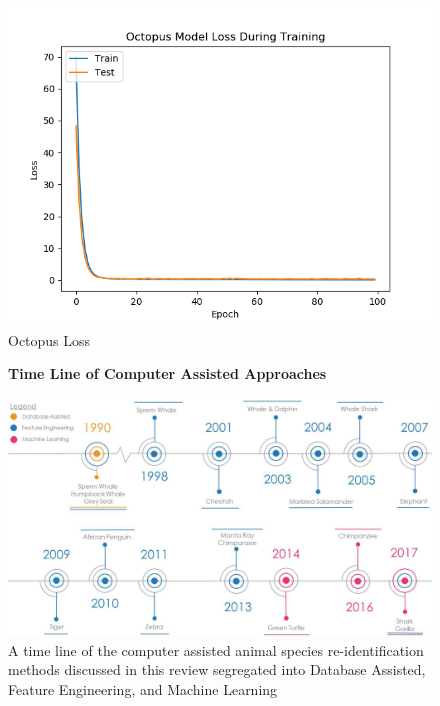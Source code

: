 \documentclass[11pt]{article}
\begin{document}
\begin{figure}
    \includegraphics[width=17cm]{OctopusLoss.png}
  \caption{Octopus Loss}
\end{figure}

\begin{figure}[t!]
	\centering
	\textbf{Time Line of Computer Assisted Approaches}\par
	\includegraphics[width=17cm]{SpeciesTimeLine.jpg}
	\caption{A time line of the computer assisted animal species re-identification methods discussed in this review segregated into Database Assisted, Feature Engineering, and Machine Learning}
\end{figure}


\clearpage


\end{document}
